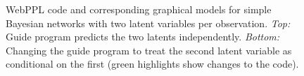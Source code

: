\begin{figure}
\caption{WebPPL code and corresponding graphical models for simple Bayesian networks with two latent variables per observation. \emph{Top:} Guide program predicts the two latents independently. \emph{Bottom:} Changing the guide program to treat the second latent variable as conditional on the first (green highlights show changes to the code).~}
\label{fig:bn_twoLatent}
\end{figure}


